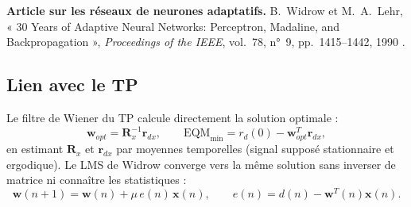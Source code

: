 \textbf{Article sur les réseaux de neurones adaptatifs.} B.~Widrow et M.~A.~Lehr, « 30 Years of Adaptive Neural Networks: Perceptron, Madaline, and Backpropagation », \emph{Proceedings of the IEEE}, vol.~78, n°~9, pp.~1415--1442, 1990 \cite{widrowlehr1990}.

\subsection{Lien avec le TP}

Le filtre de Wiener du TP calcule directement la solution optimale :
\[
\mathbf{w}_{opt}=\mathbf{R}_x^{-1}\mathbf{r}_{dx},
\qquad
\mathrm{EQM}_{\min}=r_d(0)-\mathbf{w}_{opt}^T\mathbf{r}_{dx},
\]
en estimant $\mathbf{R}_x$ et $\mathbf{r}_{dx}$ par moyennes temporelles (signal supposé stationnaire et ergodique). Le LMS de Widrow converge vers la même solution sans inverser de matrice ni connaître les statistiques :
\[
\mathbf{w}(n+1)=\mathbf{w}(n)+\mu\,e(n)\,\mathbf{x}(n),\qquad e(n)=d(n)-\mathbf{w}^T(n)\mathbf{x}(n).
\]
